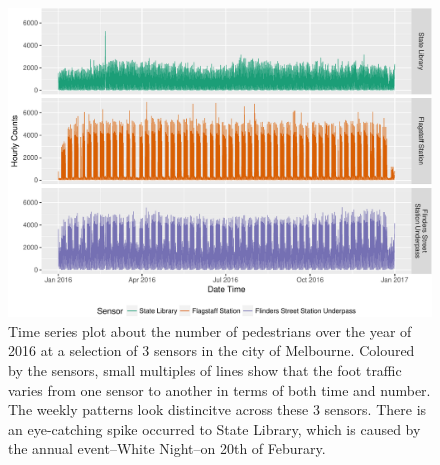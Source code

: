 \documentclass[article]{jss}
\begin{document}
\begin{CodeChunk}
\begin{figure}

{\centering \includegraphics[width=\textwidth]{figure/time-series-plot-1} 

}

\caption[Time series plot about the number of pedestrians over the year of 2016 at a selection of 3 sensors in the city of Melbourne]{Time series plot about the number of pedestrians over the year of 2016 at a selection of 3 sensors in the city of Melbourne. Coloured by the sensors, small multiples of lines show that the foot traffic varies from one sensor to another in terms of both time and number. The weekly patterns look distincitve across these 3 sensors. There is an eye-catching spike occurred to State Library, which is caused by the annual event--White Night--on 20th of Feburary.}\label{fig:time-series-plot}
\end{figure}
\end{CodeChunk}
\end{document}
